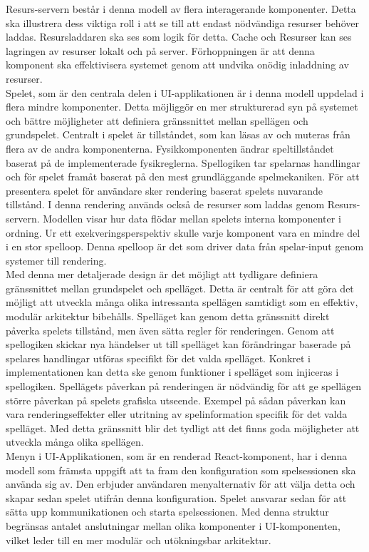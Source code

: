 Resurs-servern består i denna modell av flera interagerande komponenter. Detta ska illustrera dess viktiga roll i att se till att endast nödvändiga resurser behöver laddas. Resursladdaren ska ses som logik för detta. Cache och Resurser kan ses lagringen av resurser lokalt och på server. Förhoppningen är att denna komponent ska effektivisera systemet genom att undvika onödig inladdning av resurser.\\

Spelet, som är den centrala delen i UI-applikationen är i denna modell uppdelad i flera mindre komponenter. Detta möjliggör en mer strukturerad syn på systemet och bättre möjligheter att definiera gränssnittet mellan spellägen och grundspelet. Centralt i spelet är tillståndet, som kan läsas av och muteras från flera av de andra komponenterna. Fysikkomponenten ändrar speltillståndet baserat på de implementerade fysikreglerna. Spellogiken tar spelarnas handlingar och för spelet framåt baserat på den mest grundläggande spelmekaniken. För att presentera spelet för användare sker rendering baserat spelets nuvarande tillstånd. I denna rendering används också de resurser som laddas genom Resurs-servern. Modellen visar hur data flödar mellan spelets interna komponenter i ordning. Ur ett exekveringsperspektiv skulle varje komponent vara en mindre del i en stor spelloop. Denna spelloop är det som driver data från spelar-input genom systemer till rendering.\\

Med denna mer detaljerade design är det möjligt att tydligare definiera gränssnittet mellan grundspelet och spelläget. Detta är centralt för att göra det möjligt att utveckla många olika intressanta spellägen samtidigt som en effektiv, modulär arkitektur bibehålls. Spelläget kan genom detta gränssnitt direkt påverka spelets tillstånd, men även sätta regler för renderingen. Genom att spellogiken skickar nya händelser ut till spelläget kan förändringar baserade på spelares handlingar utföras specifikt för det valda spelläget. Konkret i implementationen kan detta ske genom funktioner i spelläget som injiceras i spellogiken. Spellägets påverkan på renderingen är nödvändig för att ge spellägen större påverkan på spelets grafiska utseende. Exempel på sådan påverkan kan vara renderingseffekter eller utritning av spelinformation specifik för det valda spelläget. Med detta gränssnitt blir det tydligt att det finns goda möjligheter att utveckla många olika spellägen.\\

Menyn i UI-Applikationen, som är en renderad React-komponent, har i denna modell som främsta uppgift att ta fram den konfiguration som spelsessionen ska använda sig av. Den erbjuder användaren menyalternativ för att välja detta och skapar sedan spelet utifrån denna konfiguration. Spelet ansvarar sedan för att sätta upp kommunikationen och starta spelsessionen. Med denna struktur begränsas antalet anslutningar mellan olika komponenter i UI-komponenten, vilket leder till en mer modulär och utökningsbar arkitektur.\\

